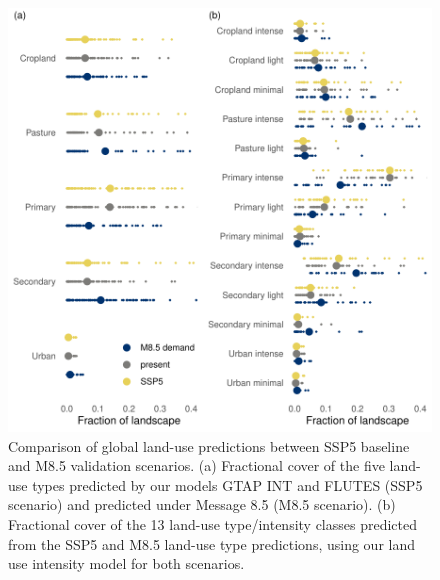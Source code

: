 \documentclass[titlesmallcaps,copyrightpage]{uomthesis}\usepackage[]{graphicx}\usepackage[]{color}
\begin{document}
\begin{figure}[htb]
  \centering
    \includegraphics{chapters/figures/chapter4/fig_landusecomp.pdf}
    \caption{Comparison of global land-use predictions between SSP5 baseline and M8.5 validation scenarios. (a) Fractional cover of the five land-use types predicted by our models GTAP INT and FLUTES (SSP5 scenario) and predicted under Message 8.5 (M8.5 scenario). (b) Fractional cover of the 13 land-use type/intensity classes predicted from the SSP5 and M8.5 land-use type predictions, using our land use intensity model for both scenarios.}
    \label{ch4:fig_landusecomp}
\end{figure}
\end{document}
